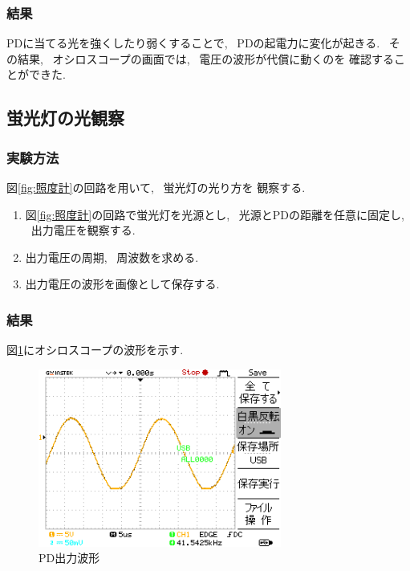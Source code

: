\documentclass[titlepage]{jsarticle}
\begin{document}
        \subsubsection{結果}
            PDに当てる光を強くしたり弱くすることで, ~PDの起電力に変化が起きる.
            ~その結果, ~オシロスコープの画面では, ~電圧の波形が代償に動くのを
            確認することができた.

    \subsection{蛍光灯の光観察}
        \subsubsection{実験方法}
            図\ref{fig:照度計}の回路を用いて, ~蛍光灯の光り方を
            観察する.

            \begin{enumerate}
                \item 図\ref{fig:照度計}の回路で蛍光灯を光源とし,
                    ~光源とPDの距離を任意に固定し, ~出力電圧を観察する.
                \item 出力電圧の周期, ~周波数を求める.
                \item 出力電圧の波形を画像として保存する.
            \end{enumerate}

        \subsubsection{結果}
            図\ref{fig:波形}にオシロスコープの波形を示す.

            \begin{figure}[ht]
                \centering
                \includegraphics[width=8cm]{images/A0000DS.BMP}
                \caption{PD出力波形}
                \label{fig:波形}
            \end{figure}
\end{document}
